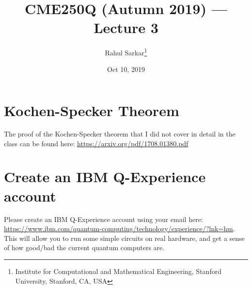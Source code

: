 \documentclass[10pt]{article}
\title{CME250Q (Autumn 2019) --- Lecture 3}
\author{Rahul Sarkar\footnote{Institute for Computational and Mathematical Engineering, Stanford University, Stanford, CA, USA}}
\date{Oct 10, 2019}
\newcounter{ex}
\theoremstyle{plain}
\theoremstyle{definition}
\begin{document}
\maketitle


\section{Kochen-Specker Theorem}
The proof of the Kochen-Specker theorem that I did not cover in detail in the class can be found here:
\url{https://arxiv.org/pdf/1708.01380.pdf}

\section{Create an IBM Q-Experience account}
Please create an IBM Q-Experience account using your email here:
\url{https://www.ibm.com/quantum-computing/technology/experience/?lnk=hm}.
This will allow you to run some simple circuits on real hardware, and get a sense of how good/bad the current quantum computers are.
\end{document}
